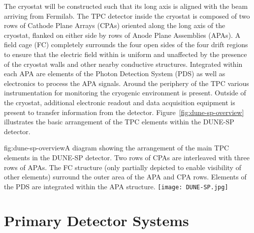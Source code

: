 The cryostat will be constructed such that its long axis is aligned with the beam arriving from Fermilab.  The TPC detector inside the cryostat is composed of two rows of Cathode Plane Arrays (CPAs) oriented along the long axis of the cryostat, flanked on either side by rows of Anode Plane Assemblies (APAs).  A field cage (FC) completely surrounds the four
open sides of the four drift regions to ensure that the electric field within is uniform and unaffected by the presence of the cryostat walls and other nearby conductive structures.  Integrated within each APA are elements of the Photon Detection System (PDS) as well as electronics to process the APA signals.  Around the periphery of the TPC various instrumentation for monitoring the cryogenic environment is present.  Outside of the cryostat, additional electronic readout and data acquisition equipment is present to transfer information from the detector.  Figure~\ref{fig:dune-sp-overview} illustrates the basic arrangement of the TPC elements within the DUNE-SP detector.

\begin{dunefigure}{fig:dune-sp-overview}{A diagram showing the arrangement of the main TPC elements in the DUNE-SP detector.  Two rows of CPAs are interleaved with three rows of APAs.  The FC structure (only partially depicted to enable visibility of other elements) surround the outer area of the APA and CPA rows.  Elements of the PDS are integrated within the APA structure.}
\texttt{[image: DUNE-SP.jpg]}
\end{dunefigure}



\section{Primary Detector Systems}
\label{sec:fdsp-ov-sys}


 

